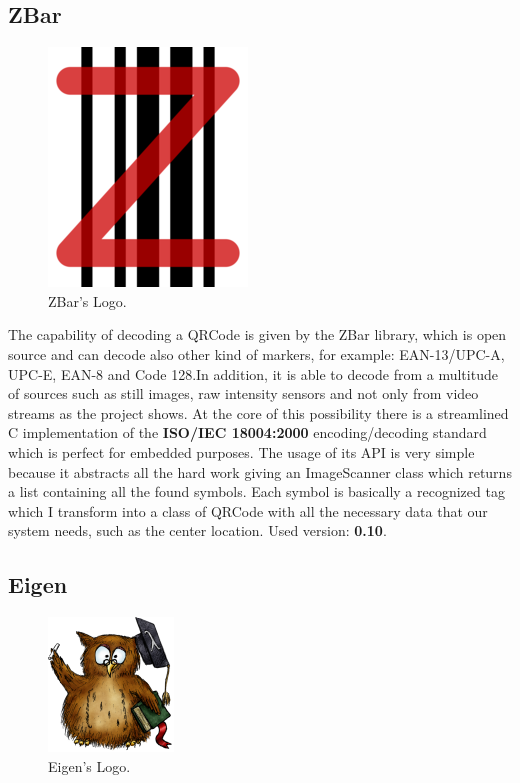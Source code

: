 \subsection{ZBar}
\begin{figure}[hbt]
    \centering
    \includegraphics[scale=0.5]{img/zbar.png}
    \caption{ZBar's Logo.}
\end{figure}
The capability of decoding a QRCode is given by the ZBar library, which is open source and can decode also other kind of markers, for example: EAN-13/UPC-A, UPC-E, EAN-8 and Code 128.In addition, it is able to decode from a multitude of sources such as still images, raw intensity sensors and not only from video streams as the project shows. At the core of this possibility there is a streamlined C implementation of the \textbf{ISO/IEC 18004:2000} encoding/decoding standard which is perfect for embedded purposes.
The usage of its API is very simple because it abstracts all the hard work giving an ImageScanner class which returns a list containing all the found symbols. Each symbol is basically a recognized tag which I transform into a class of QRCode with all the necessary data that our system needs, such as the center location.
\newline Used version: \textbf{0.10}.

\subsection{Eigen}

\begin{figure}[hbt]
    \centering
    \includegraphics[scale=0.5]{img/eigen.png}
    \caption{Eigen's Logo.}
\end{figure}

